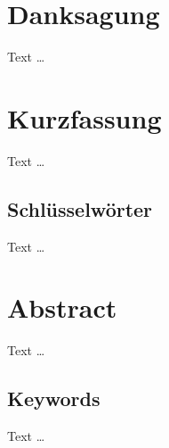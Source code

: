 \chapter*{Danksagung}
\begin{comment}
Kurzer Dank an Personen, die Sie bei der Arbeit unterstützt haben. Z. B. inoffizielle Betreuer, Teilnehmer an den Evaluationen (nie namentlich nennen), Medientechnik, Sekretärin, etc. pp. — nur wenn Sie den Personen wirklich dankbar sind. (Ist nett aber für die Bewertung irrelevant.)
Falls nicht verwendet diese Seite einfach entfernen.
\end{comment}

Text \dots

\newpage
\chapter*{Kurzfassung}
\begin{comment}
Abstract schon für Zwischenabgabe schreiben. Später kommen dann noch Sätze dazu, aber Grundgerüst steht.

Kein "Teaser" sondern eine kurze Zusammenfassung (das, was man braucht, um sich schnell einen Überblick zu verschaffen, ob es sich lohnt, die Arbeit zu lesen).

Inhalt umfasst die zentralen Punkte aller Kapitel, von Ziel/Fragestellung bis Ausblick.

Nie länger als diese eine Seite (inkl. Schlüsselwörter).
\end{comment}

Text \dots

\section*{Schlüsselwörter}
\begin{comment}
Verwendete Literatur gibt Hinweise auf passende Stichwörter. Das sind die Suchbegriffe, die man bei einer Literatursuche verwenden würde.
\end{comment}

Text \dots

\newpage
\chapter*{Abstract}
\begin{comment}
Englische Version der Kurzfassung.
Nicht einfach Google Translate oder DeepL verwenden. Trifft die Nuancen nicht und klingt z. T. nach Yoda.
\end{comment}

Text \dots

\section*{Keywords}
Text \dots

\newpage